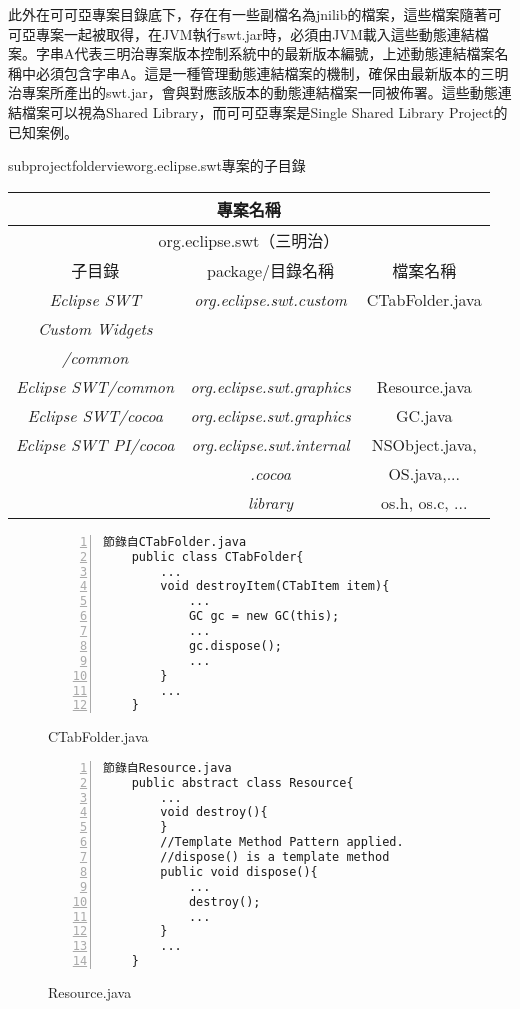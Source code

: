 此外在可可亞專案目錄底下，存在有一些副檔名為jnilib的檔案，這些檔案隨著可可亞專案一起被取得，在JVM執行swt.jar時，必須由JVM載入這些動態連結檔案。字串A代表三明治專案版本控制系統中的最新版本編號，上述動態連結檔案名稱中必須包含字串A。這是一種管理動態連結檔案的機制，確保由最新版本的三明治專案所產出的swt.jar，會與對應該版本的動態連結檔案一同被佈署。這些動態連結檔案可以視為Shared Library，而可可亞專案是Single Shared Library Project的已知案例。

\begin{myTable}{subprojectfolderview}{org.eclipse.swt專案的子目錄}
\begin{tabular}[width=\textwidth]{|c|c|c|}
\hline
\multicolumn{3}{|c|}{專案名稱}\\
\hline
\multicolumn{3}{|c|}{org.eclipse.swt（三明治）}\\
\hline
子目錄&package/目錄名稱&檔案名稱\\
\hline
\textit{Eclipse SWT}&\textit{org.eclipse.swt.custom}&CTabFolder.java\\
\textit{Custom Widgets}&&\\
\textit{/common}&&\\
\hline
\hline
\textit{Eclipse SWT/common}&\textit{org.eclipse.swt.graphics}&Resource.java\\
\hline
\hline
\textit{Eclipse SWT/cocoa}&\textit{org.eclipse.swt.graphics}&GC.java\\
\hline
\hline
\textit{Eclipse SWT PI/cocoa}&\textit{org.eclipse.swt.internal}&NSObject.java,\\
&\textit{.cocoa}&OS.java,...\\
\hline
&\textit{library}&os.h, os.c, ...\\
\hline
\end{tabular}
\label{swtfolderview}
\end{myTable}

\begin{figure}
\linespread{0.8}
\begin{Verbatim}[numbers=left,framesep=1mm,numbersep=-12pt]
	節錄自CTabFolder.java
	public class CTabFolder{
		...
		void destroyItem(CTabItem item){
			...
			GC gc = new GC(this);
			...
			gc.dispose();
			...
		}
		...
	}
\end{Verbatim}
\caption{CTabFolder.java}
\label{ctabfolder}
\end{figure}

\begin{figure}
\linespread{0.8}
\begin{Verbatim}[numbers=left,framesep=1mm,numbersep=-12pt]
	節錄自Resource.java
	public abstract class Resource{
		...
		void destroy(){
		}
		//Template Method Pattern applied.
		//dispose() is a template method
		public void dispose(){
			...
			destroy();
			...
		}
		...
	}
\end{Verbatim}
\caption{Resource.java}
\label{resource}
\end{figure}

